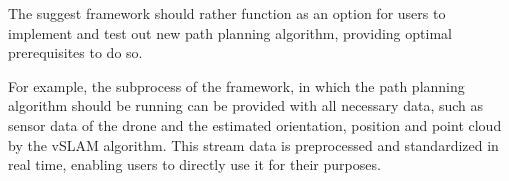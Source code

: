 \begin{enumerate}
 The suggest framework should rather function as an option for users to implement and test out new path planning algorithm, providing optimal 
 prerequisites to do so. 
 
 For example, the subprocess of the framework, in which the path planning algorithm should be running can be provided with all necessary data, 
 such as sensor data of the drone and the estimated orientation, position and point cloud by the vSLAM algorithm. This stream data is preprocessed 
 and standardized 
 in real time, enabling users to directly use it for their purposes. 
 
 
\end{enumerate} 
 
 




